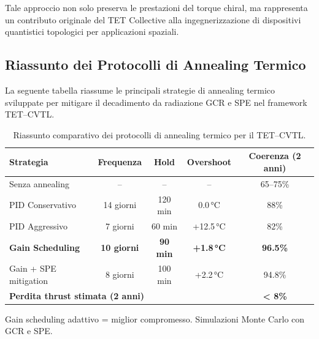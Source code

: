 \documentclass[11pt,a4paper]{article}
\theoremstyle{plain}
\theoremstyle{definition}
\begin{document}
\vspace{0.3cm}


Tale approccio non solo preserva le prestazioni del torque chiral, ma rappresenta un contributo originale del TET Collective alla ingegnerizzazione di dispositivi quantistici topologici per applicazioni spaziali.





\subsection{Riassunto dei Protocolli di Annealing Termico}

\vspace{0.2cm}

La seguente tabella riassume le principali strategie di annealing termico sviluppate per mitigare il decadimento da radiazione GCR e SPE nel framework TET--CVTL.


\vspace{0.3cm}



\begin{table}[H]
\centering
\small
\renewcommand{\arraystretch}{1.2}

\begin{tabular}{l@{\quad}cccc}
\toprule
\rowcolor{teal!15}
\textbf{Strategia} & \textbf{Frequenza} & \textbf{Hold} & \textbf{Overshoot} & \textbf{Coerenza (2 anni)} \\
\midrule
Senza annealing          & --          & --     & --          & 65--75\% \\
PID Conservativo         & 14 giorni   & 120 min & 0.0\,°C    & 88\% \\
PID Aggressivo           & 7 giorni    & 60 min  & +12.5\,°C  & 82\% \\
\textbf{Gain Scheduling} & \textbf{10 giorni} & \textbf{90 min} & \textbf{+1.8\,°C} & \textbf{96.5\%} \\
Gain + SPE mitigation    & 8 giorni    & 100 min & +2.2\,°C   & 94.8\% \\
\midrule
\multicolumn{4}{l}{\textbf{Perdita thrust stimata (2 anni)}} & \textbf{< 8\%} \\
\bottomrule
\end{tabular}

\vspace{8pt}

{\footnotesize Gain scheduling adattivo = miglior compromesso. Simulazioni Monte Carlo con GCR e SPE.}

\caption{Riassunto comparativo dei protocolli di annealing termico per il TET--CVTL.}
\label{tab:annealing_summary}
\end{table}
\end{document}
